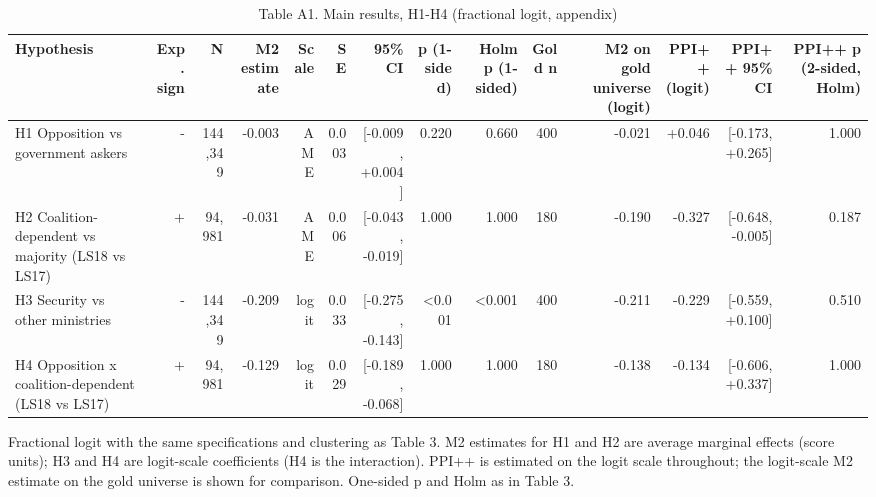 \begin{table}[ht]
\centering
\small
\caption{Table A1. Main results, H1-H4 (fractional logit, appendix)}
\begin{tabular}{lrrrrrrrrrrrrr}
\toprule
Hypothesis & Exp. sign & N & M2 estimate & Scale & SE & 95\% CI & p (1-sided) & Holm p (1-sided) & Gold n & M2 on gold universe (logit) & PPI++ (logit) & PPI++ 95\% CI & PPI++ p (2-sided, Holm) \\
\midrule
H1 Opposition vs government askers & - & 144,349 & -0.003 & AME & 0.003 & {[}-0.009, +0.004] & 0.220 & 0.660 & 400 & -0.021 & +0.046 & {[}-0.173, +0.265] & 1.000 \\
H2 Coalition-dependent vs majority (LS18 vs LS17) & + & 94,981 & -0.031 & AME & 0.006 & {[}-0.043, -0.019] & 1.000 & 1.000 & 180 & -0.190 & -0.327 & {[}-0.648, -0.005] & 0.187 \\
H3 Security vs other ministries & - & 144,349 & -0.209 & logit & 0.033 & {[}-0.275, -0.143] & <0.001 & <0.001 & 400 & -0.211 & -0.229 & {[}-0.559, +0.100] & 0.510 \\
H4 Opposition x coalition-dependent (LS18 vs LS17) & + & 94,981 & -0.129 & logit & 0.029 & {[}-0.189, -0.068] & 1.000 & 1.000 & 180 & -0.138 & -0.134 & {[}-0.606, +0.337] & 1.000 \\
\bottomrule
\end{tabular}
\par\footnotesize Fractional logit with the same specifications and clustering as Table 3. M2 estimates for H1 and H2 are average marginal effects (score units); H3 and H4 are logit-scale coefficients (H4 is the interaction). PPI++ is estimated on the logit scale throughout; the logit-scale M2 estimate on the gold universe is shown for comparison. One-sided p and Holm as in Table 3.
\end{table}
